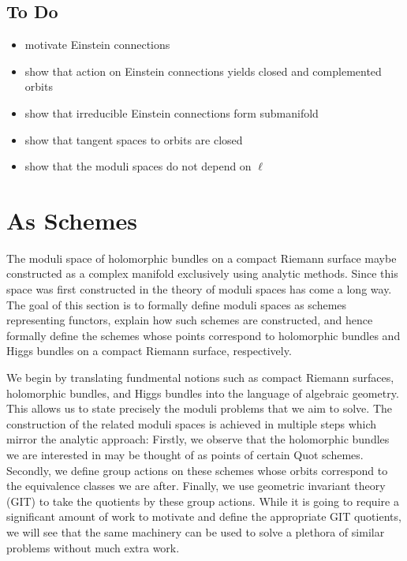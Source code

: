 \documentclass[12pt]{ociamthesis}  %
\begin{document}
\section{To Do}

\begin{itemize}
  \item motivate Einstein connections
  \item show that action on Einstein connections yields closed and complemented orbits
  \item show that irreducible Einstein connections form submanifold
  \item show that tangent spaces to orbits are closed
  \item show that the moduli spaces do not depend on $\ell$
\end{itemize}

\missingsection

\chapter{As Schemes}

The moduli space of holomorphic bundles on a compact Riemann
surface maybe constructed as a complex manifold exclusively
using analytic methods. Since this space was first constructed
in \missingcitation
the theory of moduli spaces has come a long way.
The goal of this section is to formally define moduli spaces
as schemes representing functors, explain how such schemes
are constructed, and hence formally define the schemes whose
points correspond to holomorphic bundles and Higgs bundles
on a compact Riemann surface, respectively.

We begin by translating fundmental notions such as compact
Riemann surfaces, holomorphic bundles, and Higgs bundles into
the language of algebraic geometry. This allows us to state
precisely the moduli problems that we aim to solve. The construction
of the related moduli spaces is achieved in multiple steps which
mirror the analytic approach: Firstly, we observe that the
holomorphic bundles we are interested in may be thought of as
points of certain Quot schemes. Secondly, we define group
actions on these schemes whose orbits correspond to the
equivalence classes we are after. Finally, we use geometric
invariant theory (GIT) to take the quotients by these group
actions. While it is going to require a significant amount of
work to motivate and define the appropriate GIT quotients,
we will see that the same machinery can be used to solve
a plethora of similar problems without much extra work.
\end{document}
